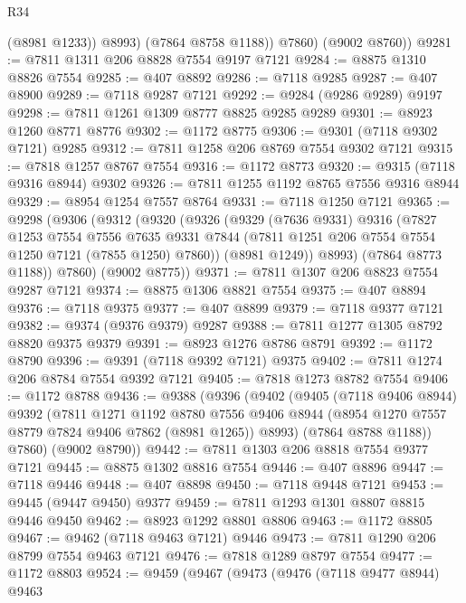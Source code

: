 \begin{lexlean}{R34}
\begin{coremodule}
              (@8981 @1233))
            @8993)
          (@7864 @8758 @1188))
        @7860)
      (@9002 @8760))
@9281 := @7811 @1311 @206 @8828 @7554 @9197 @7121
@9284 := @8875 @1310 @8826 @7554
@9285 := @407 @8892
@9286 := @7118 @9285
@9287 := @407 @8900
@9289 := @7118 @9287 @7121
@9292 := @9284 (@9286 @9289) @9197
@9298 := @7811 @1261 @1309 @8777 @8825 @9285 @9289
@9301 := @8923 @1260 @8771 @8776
@9302 := @1172 @8775
@9306 := @9301 (@7118 @9302 @7121) @9285
@9312 := @7811 @1258 @206 @8769 @7554 @9302 @7121
@9315 := @7818 @1257 @8767 @7554
@9316 := @1172 @8773
@9320 := @9315 (@7118 @9316 @8944) @9302
@9326 := @7811 @1255 @1192 @8765 @7556 @9316 @8944
@9329 := @8954 @1254 @7557 @8764
@9331 := @7118 @1250 @7121
@9365 := @9298
    (@9306
      (@9312
        (@9320
          (@9326
            (@9329
              (@7636 @9331)
              @9316
              (@7827
                @1253
                @7554
                @7556
                @7635
                @9331
                @7844
                (@7811 @1251 @206 @7554 @7554 @1250 @7121 (@7855 @1250) @7860))
              (@8981 @1249))
            @8993)
          (@7864 @8773 @1188))
        @7860)
      (@9002 @8775))
@9371 := @7811 @1307 @206 @8823 @7554 @9287 @7121
@9374 := @8875 @1306 @8821 @7554
@9375 := @407 @8894
@9376 := @7118 @9375
@9377 := @407 @8899
@9379 := @7118 @9377 @7121
@9382 := @9374 (@9376 @9379) @9287
@9388 := @7811 @1277 @1305 @8792 @8820 @9375 @9379
@9391 := @8923 @1276 @8786 @8791
@9392 := @1172 @8790
@9396 := @9391 (@7118 @9392 @7121) @9375
@9402 := @7811 @1274 @206 @8784 @7554 @9392 @7121
@9405 := @7818 @1273 @8782 @7554
@9406 := @1172 @8788
@9436 := @9388
    (@9396
      (@9402
        (@9405
          (@7118 @9406 @8944)
          @9392
          (@7811
            @1271
            @1192
            @8780
            @7556
            @9406
            @8944
            (@8954 @1270 @7557 @8779 @7824 @9406 @7862 (@8981 @1265))
            @8993)
          (@7864 @8788 @1188))
        @7860)
      (@9002 @8790))
@9442 := @7811 @1303 @206 @8818 @7554 @9377 @7121
@9445 := @8875 @1302 @8816 @7554
@9446 := @407 @8896
@9447 := @7118 @9446
@9448 := @407 @8898
@9450 := @7118 @9448 @7121
@9453 := @9445 (@9447 @9450) @9377
@9459 := @7811 @1293 @1301 @8807 @8815 @9446 @9450
@9462 := @8923 @1292 @8801 @8806
@9463 := @1172 @8805
@9467 := @9462 (@7118 @9463 @7121) @9446
@9473 := @7811 @1290 @206 @8799 @7554 @9463 @7121
@9476 := @7818 @1289 @8797 @7554
@9477 := @1172 @8803
@9524 := @9459
    (@9467
      (@9473
        (@9476
          (@7118 @9477 @8944)
          @9463

\end{coremodule}
\end{lexlean}
